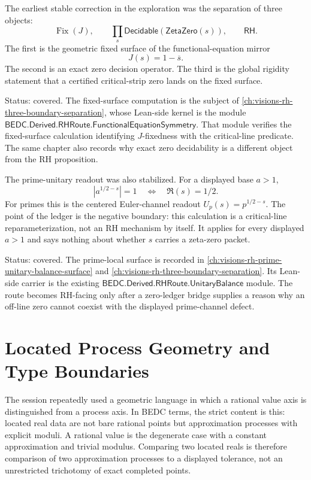 The earliest stable correction in the exploration was the separation of
three objects:
$$
\operatorname{Fix}(J),
\qquad
\prod_s \mathsf{Decidable}(\mathsf{ZetaZero}(s)),
\qquad
\mathsf{RH}.
$$
The first is the geometric fixed surface of the functional-equation mirror
$$
J(s)=1-\overline{s}.
$$
The second is an exact zero decision operator.  The third is the global
rigidity statement that a certified critical-strip zero lands on the fixed
surface.

Status: covered.  The fixed-surface computation is the subject of
\autoref{ch:visions-rh-three-boundary-separation}, whose Lean-side kernel is
the module $\mathsf{BEDC.Derived.RHRoute.FunctionalEquationSymmetry}$.  That
module verifies the fixed-surface calculation identifying $J$-fixedness with
the critical-line predicate.  The same chapter also records why exact zero
decidability is a different object from the RH proposition.

The prime-unitary readout was also stabilized.  For a displayed base
$a>1$,
$$
|a^{1/2-s}|=1
\quad\Longleftrightarrow\quad
\Re(s)=1/2.
$$
For primes this is the centered Euler-channel readout
$U_p(s)=p^{1/2-s}$.  The point of the ledger is the negative boundary: this
calculation is a critical-line reparameterization, not an RH mechanism by
itself.  It applies for every displayed $a>1$ and says nothing about whether
$s$ carries a zeta-zero packet.

Status: covered.  The prime-local surface is recorded in
\autoref{ch:visions-rh-prime-unitary-balance-surface} and
\autoref{ch:visions-rh-three-boundary-separation}.  Its Lean-side carrier is
the existing $\mathsf{BEDC.Derived.RHRoute.UnitaryBalance}$ module.  The
route becomes RH-facing only after a zero-ledger bridge supplies a reason why
an off-line zero cannot coexist with the displayed prime-channel defect.

\section{Located Process Geometry and Type Boundaries}
\label{sec:rh-ledger-located-process-geometry}

The session repeatedly used a geometric language in which a rational value
axis is distinguished from a process axis.  In BEDC terms, the strict content
is this: located real data are not bare rational points but approximation
processes with explicit moduli.  A rational value is the degenerate case with
a constant approximation and trivial modulus.  Comparing two located reals is
therefore comparison of two approximation processes to a displayed tolerance,
not an unrestricted trichotomy of exact completed points.


